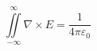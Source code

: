\documentclass[12pt]{scrartcl}
\begin{document}
\begin{enumerate}[leftmargin=*]
    \begin{equation*}
        \iint\limits_{-\infty}^{\infty} \nabla \times E = \frac{1}{4\pi \varepsilon_0}
    \end{equation*}


\end{enumerate}
\end{document}
